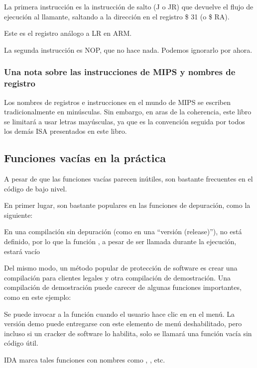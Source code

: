 

La primera instrucción es la instrucción de salto (J o JR) que devuelve el flujo de ejecución al \gls {llamante},
saltando a la dirección en el registro \$ 31 (o \$ RA).

Este es el registro análogo a \ac{LR} en ARM.

La segunda instrucción es \ac{NOP}, que no hace nada.
Podemos ignorarlo por ahora.

\subsubsection{Una nota sobre las instrucciones de MIPS y nombres de registro}

Los nombres de registros e instrucciones en el mundo de MIPS se escriben tradicionalmente en minúsculas.
Sin embargo, en aras de la coherencia, este libro se limitará a usar letras mayúsculas,
ya que es la convención seguida por todos los demás \ac {ISA} presentados en este libro.

\subsection{Funciones vacías en la práctica}

A pesar de que las funciones vacías parecen inútiles, son bastante frecuentes en el código de bajo nivel.

En primer lugar, son bastante populares en las funciones de depuración, como la siguiente:



En una compilación sin depuración (como en una ``versión (release)''),  no está definido,
por lo que la función , a pesar de ser llamada durante la ejecución,
estará vacío

Del mismo modo, un método popular de protección de software es crear una compilación para clientes legales y otra compilación de demostración.
Una compilación de demostración puede carecer de algunas funciones importantes, como en este ejemplo:



Se puede invocar a la función  cuando el usuario hace clic en  en el menú.
La versión demo puede entregarse con este elemento de menú deshabilitado, pero incluso si un cracker de software lo habilita,
solo se llamará una función vacía sin código útil.

IDA marca tales funciones con nombres como , , etc.
